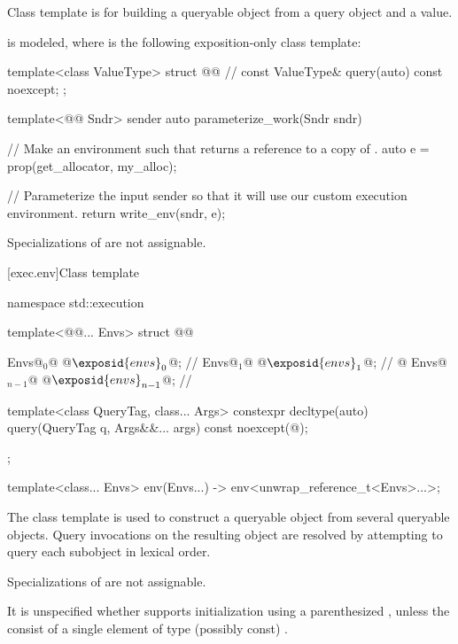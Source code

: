 \pnum
Class template  is for building a queryable object
from a query object and a value.

\pnum
\mandates
{}
is modeled,
where  is the following exposition-only class template:
\begin{codeblock}
template<class ValueType>
struct @@ {              // \expos
  const ValueType& query(auto) const noexcept;
};
\end{codeblock}

\pnum
\begin{example}
\begin{codeblock}
template<@@ Sndr>
sender auto parameterize_work(Sndr sndr) {
  // Make an environment such that  returns a reference to a copy of .
  auto e = prop(get_allocator, my_alloc{});

  // Parameterize the input sender so that it will use our custom execution environment.
  return write_env(sndr, e);
}
\end{codeblock}
\end{example}

\pnum
Specializations of  are not assignable.

[exec.env]{Class template }

\begin{codeblock}
namespace std::execution {
  template<@@... Envs>
  struct @@ {
    Envs@$_0$@ @$\exposid{envs}_0$@;               // \expos
    Envs@$_1$@ @$\exposid{envs}_1$@;               // \expos
      @\vdots@
    Envs@$_{n-1}$@ @$\exposid{envs}_{n-1}$@;           // \expos

    template<class QueryTag, class... Args>
      constexpr decltype(auto) query(QueryTag q, Args&&... args) const noexcept(@\seebelow@);
  };

  template<class... Envs>
    env(Envs...) -> env<unwrap_reference_t<Envs>...>;
}
\end{codeblock}

\pnum
The class template  is used to construct a queryable object
from several queryable objects.
Query invocations on the resulting object are resolved
by attempting to query each subobject in lexical order.

\pnum
Specializations of  are not assignable.

\pnum
It is unspecified
whether  supports initialization
using a parenthesized ,
unless the  consist of
a single element of type (possibly const) .

